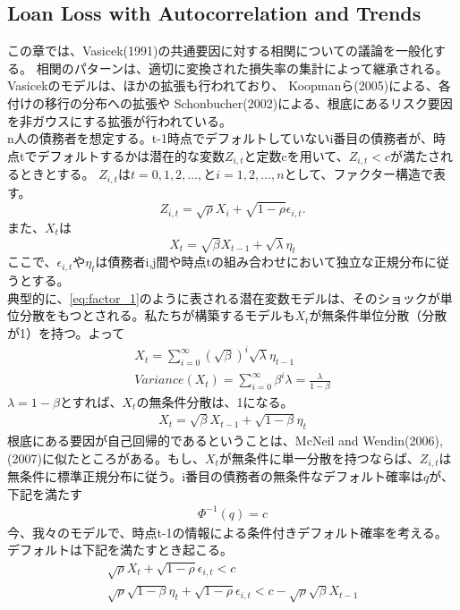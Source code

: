 \documentclass[a4j,12pt]{jarticle}
\begin{document}
\subsection{Loan Loss with Autocorrelation and Trends}
この章では、Vasicek(1991)の共通要因に対する相関についての議論を一般化する。
相関のパターンは、適切に変換された損失率の集計によって継承される。
Vasicekのモデルは、ほかの拡張も行われており、
Koopmanら(2005)による、各付けの移行の分布への拡張や
Schonbucher(2002)による、根底にあるリスク要因を非ガウスにする拡張が行われている。\\
n人の債務者を想定する。t-1時点でデフォルトしていないi番目の債務者が、時点tでデフォルトするかは潜在的な変数$Z_{i,t}$と定数cを用いて、$Z_{i,t}<c$が満たされるときとする。
$Z_{i,t}$は$t=0,1,2,\dots,とi=1,2,\dots,n$として、ファクター構造で表す。
\begin{equation}
Z_{i,t}=\sqrt{\rho}X_i+\sqrt{1-\rho}\epsilon_{i,t}.
\label{eq:factor_1}
\end{equation}
また、$X_t$は
\begin{equation}
X_{t}=\sqrt{\beta}X_{t-1}+\sqrt{\lambda}\eta_t
\label{eq:autocorrelation}
\end{equation}
ここで、$\epsilon_{i,t}や\eta_t$は債務者i,j間や時点tの組み合わせにおいて独立な正規分布に従うとする。\\
典型的に、\eqref{eq:factor_1}のように表される潜在変数モデルは、そのショックが単位分散をもつとされる。私たちが構築するモデルも$X_t$が無条件単位分散（分散が1）を持つ。よって
\begin{eqnarray}
X_t=\sum_{i=0}^{\infty}(\sqrt{\beta})^i \sqrt{\lambda}\eta_{t-1}\\
Variance(X_t)=\sum_{i=0}^{\infty}\beta^i \lambda=\frac{\lambda}{1-\beta}
\end{eqnarray}
$\lambda=1-\beta$とすれば、$X_t$の無条件分散は、1になる。
\begin{eqnarray}
X_{t}=\sqrt{\beta}X_{t-1}+\sqrt{1-\beta}\eta_t
\end{eqnarray}
根底にある要因が自己回帰的であるということは、McNeil and Wendin(2006),(2007)に似たところがある。もし、$X_t$が無条件に単一分散を持つならば、$Z_{i,t}$は無条件に標準正規分布に従う。i番目の債務者の無条件なデフォルト確率は$q$が、下記を満たす
\begin{eqnarray}
\Phi^{-1}(q)=c
\end{eqnarray}
今、我々のモデルで、時点t-1の情報による条件付きデフォルト確率を考える。デフォルトは下記を満たすとき起こる。
\begin{eqnarray}
\sqrt{\rho}X_t+\sqrt{1-\rho}\epsilon_{i,t}<c\\
\sqrt{\rho}\sqrt{1-\beta}\eta_t+\sqrt{1-\rho}\epsilon_{i,t}<c-\sqrt{\rho}\sqrt{\beta}X_{t-1}
\label{eq:left}
\end{eqnarray}
\end{document}
